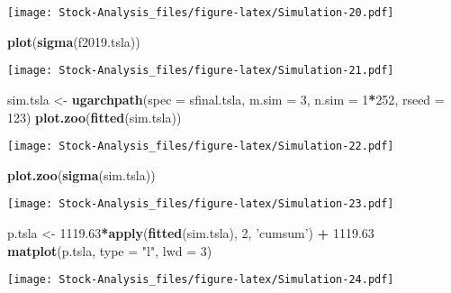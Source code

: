\documentclass[
]{article}
\newenvironment{Shaded}{\begin{snugshade}}{\end{snugshade}}
\newcommand{\DataTypeTok}[1]{\textcolor[rgb]{0.13,0.29,0.53}{#1}}
\newcommand{\DecValTok}[1]{\textcolor[rgb]{0.00,0.00,0.81}{#1}}
\newcommand{\FloatTok}[1]{\textcolor[rgb]{0.00,0.00,0.81}{#1}}
\newcommand{\KeywordTok}[1]{\textcolor[rgb]{0.13,0.29,0.53}{\textbf{#1}}}
\newcommand{\NormalTok}[1]{#1}
\newcommand{\OperatorTok}[1]{\textcolor[rgb]{0.81,0.36,0.00}{\textbf{#1}}}
\newcommand{\StringTok}[1]{\textcolor[rgb]{0.31,0.60,0.02}{#1}}
\begin{document}
\texttt{[image: Stock-Analysis\_files/figure-latex/Simulation-20.pdf]}

\begin{Shaded}
\begin{Highlighting}[]
\KeywordTok{plot}\NormalTok{(}\KeywordTok{sigma}\NormalTok{(f2019.tsla))}
\end{Highlighting}
\end{Shaded}

\texttt{[image: Stock-Analysis\_files/figure-latex/Simulation-21.pdf]}

\begin{Shaded}
\begin{Highlighting}[]
\NormalTok{sim.tsla <-}\StringTok{ }\KeywordTok{ugarchpath}\NormalTok{(}\DataTypeTok{spec =}\NormalTok{ sfinal.tsla,}
                  \DataTypeTok{m.sim =} \DecValTok{3}\NormalTok{,}
                  \DataTypeTok{n.sim =} \DecValTok{1}\OperatorTok{*}\DecValTok{252}\NormalTok{,}
                  \DataTypeTok{rseed =} \DecValTok{123}\NormalTok{)}
\KeywordTok{plot.zoo}\NormalTok{(}\KeywordTok{fitted}\NormalTok{(sim.tsla))}
\end{Highlighting}
\end{Shaded}

\texttt{[image: Stock-Analysis\_files/figure-latex/Simulation-22.pdf]}

\begin{Shaded}
\begin{Highlighting}[]
\KeywordTok{plot.zoo}\NormalTok{(}\KeywordTok{sigma}\NormalTok{(sim.tsla))}
\end{Highlighting}
\end{Shaded}

\texttt{[image: Stock-Analysis\_files/figure-latex/Simulation-23.pdf]}

\begin{Shaded}
\begin{Highlighting}[]
\NormalTok{p.tsla <-}\StringTok{ }\FloatTok{1119.63}\OperatorTok{*}\KeywordTok{apply}\NormalTok{(}\KeywordTok{fitted}\NormalTok{(sim.tsla), }\DecValTok{2}\NormalTok{, }\StringTok{'cumsum'}\NormalTok{) }\OperatorTok{+}\StringTok{ }\FloatTok{1119.63}
\KeywordTok{matplot}\NormalTok{(p.tsla, }\DataTypeTok{type =} \StringTok{"l"}\NormalTok{, }\DataTypeTok{lwd =} \DecValTok{3}\NormalTok{)}
\end{Highlighting}
\end{Shaded}

\texttt{[image: Stock-Analysis\_files/figure-latex/Simulation-24.pdf]}
\end{document}
